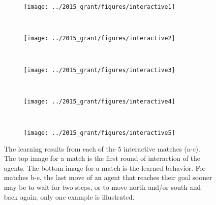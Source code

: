 
\begin{figure}
    \centering
    \begin{subfigure}[b]{0.18\textwidth}
        \texttt{[image: ../2015\_grant/figures/interactive1]}
        \caption{}
        \label{fig:inter1}
    \end{subfigure}
    ~ %
    \begin{subfigure}[b]{0.18\textwidth}
        \texttt{[image: ../2015\_grant/figures/interactive2]}
        \caption{}
        \label{fig:inter2}
    \end{subfigure}
    ~ %
    \begin{subfigure}[b]{0.18\textwidth}
        \texttt{[image: ../2015\_grant/figures/interactive3]}
        \caption{}
        \label{fig:inter3}
    \end{subfigure}
	~ %
    \begin{subfigure}[b]{0.18\textwidth}
        \texttt{[image: ../2015\_grant/figures/interactive4]}
        \caption{}
        \label{fig:inter4}
    \end{subfigure}
    ~ %
    \begin{subfigure}[b]{0.18\textwidth}
        \texttt{[image: ../2015\_grant/figures/interactive5]}
        \caption{}
        \label{fig:inter5}
    \end{subfigure}
    \caption{The learning results from each of the 5 interactive matches (a-e). The top image for a match is the first round of interaction of the agents. The bottom image for a match is the learned behavior. For matches b-e, the last move of an agent that reaches their goal sooner may be to wait for two steps, or to move north and/or south and back again; only one example is illustrated.}\label{fig:interRes}
\end{figure}

